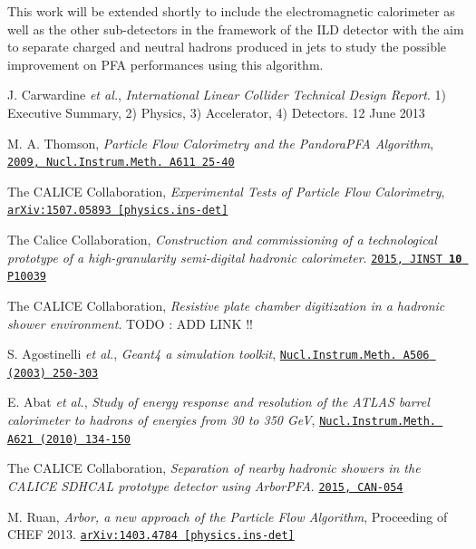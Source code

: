 \documentclass[cits]{JINST}
\begin{document}
This work will be extended shortly to include the electromagnetic calorimeter as well as the other sub-detectors in the framework of the ILD detector with the aim to separate charged and neutral hadrons produced in jets to study the possible improvement on PFA performances using this algorithm.

\newpage
\begin{thebibliography}{99}

J. Carwardine {\it et al.},  \emph{International Linear Collider Technical Design Report}. 1) Executive Summary, 2) Physics, 3) Accelerator, 4) Detectors. 12 June 2013

M. A. Thomson, \emph{Particle Flow Calorimetry and the PandoraPFA Algorithm}, \href{http://dx.doi.org/10.1016/j.nima.2009.09.009}{\tt 2009, Nucl.Instrum.Meth. A611 25-40}

The CALICE Collaboration, \emph{Experimental Tests of Particle Flow Calorimetry}, \href{http://www.arxiv.org/abs/1105.3417}{\tt arXiv:1507.05893 [physics.ins-det]}

The Calice Collaboration, \emph{Construction and commissioning of a technological prototype of a high-granularity semi-digital hadronic calorimeter}. \href{http://dx.doi.org/10.1088/1748-0221/10/10/P10039}{\tt 2015, JINST \textbf{10} P10039}

The CALICE Collaboration, \emph{Resistive plate chamber digitization in a hadronic shower environment}. TODO : ADD LINK !!

S. Agostinelli \textit{et al.}, \emph{Geant4 a simulation toolkit}, \href{http://dx.doi.org/10.1016/S0168-9002(03)01368-8}{\tt Nucl.Instrum.Meth. A506 (2003) 250-303}

E. Abat \textit{et al.}, \emph{Study of energy response and resolution of the ATLAS barrel calorimeter to hadrons of energies from 30 to 350 GeV}, \href{http://dx.doi.org/10.1016/j.nima.2010.04.054}{\tt Nucl.Instrum.Meth. A621 (2010) 134-150}

The CALICE Collaboration, \emph{Separation of nearby hadronic showers in the CALICE SDHCAL prototype detector using ArborPFA}. \href{https://twiki.cern.ch/twiki/pub/CALICE/CaliceAnalysisNotes/CAN-054.pdf}{\tt 2015, CAN-054}

M. Ruan, \emph{Arbor, a new approach of the Particle Flow Algorithm}, Proceeding of CHEF 2013. \href{http://www.arxiv.org/abs/1403.4784}{\tt arXiv:1403.4784 [physics.ins-det]}


\end{thebibliography}
\end{document}
